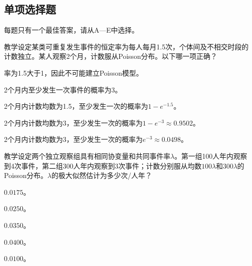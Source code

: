 \subsection{单项选择题}
每题只有一个最佳答案，请从A—E中选择。

\par\noindent\begin{minipage}{\linewidth}
教学设定某类可重复发生事件的恒定率为每人每月1.5次，个体间及不相交时段的计数独立。某人观察2个月，计数服从Poisson分布。以下哪一项正确？
\begin{choices}
\item 率为1.5大于1，因此不可能建立Poisson模型。
\item 2个月内至少发生一次事件的概率为3。
\item 2个月内计数均数为1.5，至少发生一次的概率为$1-e^{-1.5}$。
\item 2个月内计数均数为3，至少发生一次的概率为$1-e^{-3}\approx0.9502$。
\item 2个月内计数均数为3，至少发生一次的概率为$e^{-3}\approx0.0498$。
\end{choices}
\end{minipage}\par\medskip

\par\noindent\begin{minipage}{\linewidth}
教学设定两个独立观察组具有相同协变量和共同事件率$\lambda$。第一组100人年内观察到4次事件，第二组300人年内观察到3次事件；计数分别服从均数$100\lambda$和$300\lambda$的Poisson分布。$\lambda$的极大似然估计为多少次/人年？
\begin{choices}
\item $0.0175$。
\item $0.0250$。
\item $0.0350$。
\item $0.0400$。
\item $0.0100$。
\end{choices}
\end{minipage}\par\medskip

